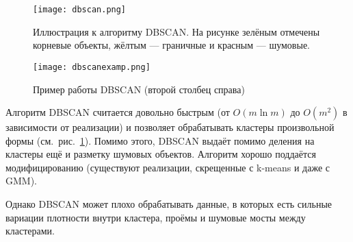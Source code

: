 \documentclass[10pt]{article}
\begin{document}
	\begin{figure}[h]
	\centering
		\texttt{[image: dbscan.png]}
	\caption{Иллюстрация к алгоритму DBSCAN. На рисунке зелёным отмечены корневые объекты, жёлтым --- граничные и красным --- шумовые.}
	\end{figure}



	\begin{figure}[h]
	\centering
		\texttt{[image: dbscanexamp.png]}
		\caption{Пример работы DBSCAN (второй столбец справа)}
		\label{fig:DBSCANres}
	\end{figure}

	Алгоритм DBSCAN считается довольно быстрым (от $O(m \ln m)$ до $O(m^2)$ в зависимости от реализации) и позволяет обрабатывать кластеры произвольной формы 
	(см.~рис.~\ref{fig:DBSCANres}).
	Помимо этого, DBSCAN выдаёт помимо деления на кластеры ещё и разметку шумовых объектов. Алгоритм хорошо поддаётся модифицированию 
	(существуют реализации, скрещенные с k-means и даже с GMM).
	
	Однако DBSCAN может плохо обрабатывать данные, в которых есть сильные вариации плотности внутри кластера, проёмы и шумовые мосты между кластерами.
\end{document}
